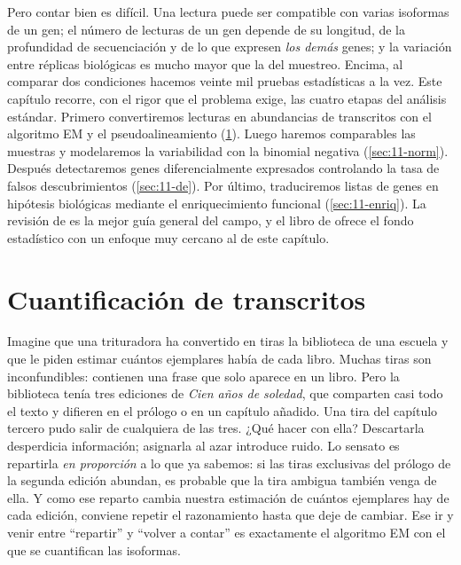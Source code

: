 Pero contar bien es difícil. Una lectura puede ser compatible con varias isoformas de un gen; el número de lecturas de un gen depende de su longitud, de la profundidad de secuenciación y de lo que expresen \emph{los demás} genes; y la variación entre réplicas biológicas es mucho mayor que la del muestreo. Encima, al comparar dos condiciones hacemos veinte mil pruebas estadísticas a la vez. Este capítulo recorre, con el rigor que el problema exige, las cuatro etapas del análisis estándar. Primero convertiremos lecturas en abundancias de transcritos con el algoritmo EM y el pseudoalineamiento (\cref{sec:11-cuant}). Luego haremos comparables las muestras y modelaremos la variabilidad con la binomial negativa (\cref{sec:11-norm}). Después detectaremos genes diferencialmente expresados controlando la tasa de falsos descubrimientos (\cref{sec:11-de}). Por último, traduciremos listas de genes en hipótesis biológicas mediante el enriquecimiento funcional (\cref{sec:11-enriq}). La revisión de \textcite{c11-conesa2016} es la mejor guía general del campo, y el libro de \textcite{c11-holmes2019} ofrece el fondo estadístico con un enfoque muy cercano al de este capítulo.

\section{Cuantificación de transcritos}\label{sec:11-cuant}

\begin{intuicion}
Imagine que una trituradora ha convertido en tiras la biblioteca de una escuela y que le piden estimar cuántos ejemplares había de cada libro. Muchas tiras son inconfundibles: contienen una frase que solo aparece en un libro. Pero la biblioteca tenía tres ediciones de \emph{Cien años de soledad}, que comparten casi todo el texto y difieren en el prólogo o en un capítulo añadido. Una tira del capítulo tercero pudo salir de cualquiera de las tres. ¿Qué hacer con ella? Descartarla desperdicia información; asignarla al azar introduce ruido. Lo sensato es repartirla \emph{en proporción} a lo que ya sabemos: si las tiras exclusivas del prólogo de la segunda edición abundan, es probable que la tira ambigua también venga de ella. Y como ese reparto cambia nuestra estimación de cuántos ejemplares hay de cada edición, conviene repetir el razonamiento hasta que deje de cambiar. Ese ir y venir entre ``repartir'' y ``volver a contar'' es exactamente el algoritmo EM con el que se cuantifican las isoformas.
\end{intuicion}

